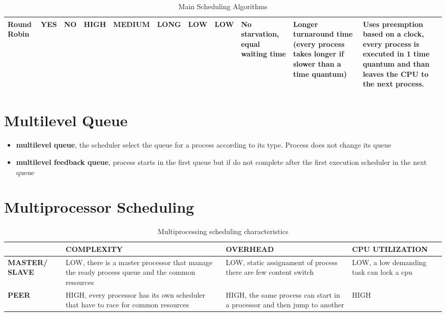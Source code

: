 \begin{table}[]
{\begin{tabular}{|m{}|m{}|m{}|m{}|m{}|m{}|m{}|m{}|m{}|m{}|m{}|}
			Round Robin                          & YES                 & NO                & HIGH                     & MEDIUM             & LONG                                                 & LOW                                             & LOW                                             & No starvation, equal waiting time                                                                                                      & Longer turnaround time (every process takes longer if slower than a time quantum)                       & Uses preemption based on a clock, every process is executed in 1 time quantum and than leaves the CPU to the next process. \\ \hline
		\end{tabular}%
	}
	\caption{Main Scheduling Algorithms}
	\label{Tab:Algorithms}
\end{table}

\pagebreak

\section{Multilevel Queue}
\begin{itemize}
	\item{\textbf{multilevel queue}}, the scheduler select the queue for a process according to its type. Process does not change its queue
	\item{\textbf{multilevel feedback queue}}, process starts in the first queue but if do not complete after the first execution scheduler in the next queue
\end{itemize}

\section{Multiprocessor Scheduling}
\begin{table}[h]
	\centering

	\begin{tabular}{|m{}|m{}|m{}|m{}|}
		\hline
		& \textbf{COMPLEXITY} & \textbf{OVERHEAD} & CPU UTILIZATION \\ \hline
		\textbf{MASTER/ SLAVE} & LOW, there is a master processor that manage the ready process queue and the common resources & LOW, static assignament of process there are few content switch & LOW, a low demanding task can lock a cpu \\ \hline
		\textbf{PEER} & HIGH, every processor has its own scheduler that have to race for common resources & HIGH, the same process can start in a processor and then jump to another & HIGH \\ \hline
	\end{tabular}
	\caption{Multiprocessing scheduling characteristics}
	\label{tab:multiprocessing}
\end{table}

